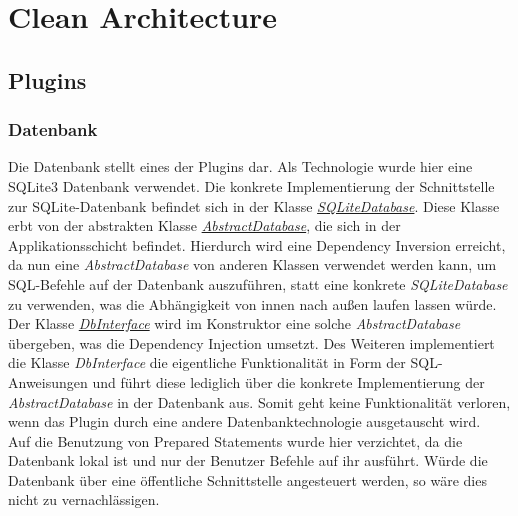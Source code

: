 \chapter{Clean Architecture}
\section{Plugins}
\subsection{Datenbank}
Die Datenbank stellt eines der Plugins dar. Als Technologie wurde hier eine SQLite3 Datenbank verwendet. Die konkrete Implementierung der Schnittstelle zur SQLite-Datenbank befindet sich in der Klasse \href{https://github.com/moorts/Morik/blob/main/src/plugins/database/SQLiteDatabase.h}{\textit{SQLiteDatabase}}. Diese Klasse erbt von der abstrakten Klasse \href{https://github.com/moorts/Morik/blob/main/src/application/AbstractDatabase.h}{\textit{AbstractDatabase}}, die sich in der Applikationsschicht befindet. Hierdurch wird eine Dependency Inversion erreicht, da nun eine \textit{AbstractDatabase} von anderen Klassen verwendet werden kann, um SQL-Befehle auf der Datenbank auszuführen, statt eine konkrete \textit{SQLiteDatabase} zu verwenden, was die Abhängigkeit von innen nach außen laufen lassen würde. Der Klasse \href{https://github.com/moorts/Morik/blob/main/src/application/DbInterface.h}{\textit{DbInterface}} wird im Konstruktor eine solche \textit{AbstractDatabase} übergeben, was die Dependency Injection umsetzt. Des Weiteren implementiert die Klasse \textit{DbInterface} die eigentliche Funktionalität in Form der SQL-Anweisungen und führt diese lediglich über die konkrete Implementierung der \textit{AbstractDatabase} in der Datenbank aus. Somit geht keine Funktionalität verloren, wenn das Plugin durch eine andere Datenbanktechnologie ausgetauscht wird.\\
Auf die Benutzung von Prepared Statements wurde hier verzichtet, da die Datenbank lokal ist und nur der Benutzer Befehle auf ihr ausführt. Würde die Datenbank über eine öffentliche Schnittstelle angesteuert werden, so wäre dies nicht zu vernachlässigen.
